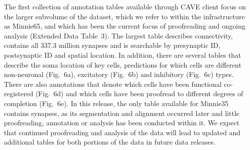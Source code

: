 \documentclass{article}
\begin{document}
The first collection of annotation tables available through CAVE client focus on the larger subvolume of the dataset, which we refer to within the infrastructure as Minnie65, and which has been the current focus of proofreading and ongoing analysis (Extended Data Table~3). The largest table describes connectivity, contains all 337.3 million synapses and is searchable by presynaptic ID, postsynaptic ID and spatial location. In addition, there are several tables that describe the soma location of key cells, predictions for which cells are different non-neuronal (Fig.~6a), excitatory (Fig.~6b) and inhibitory (Fig.~6c) types. There are also annotations that denote which cells have been functional co-registered (Fig.~6d) and which cells have been proofread to different degrees of completion (Fig.~6e). In this release, the only table available for Minnie35 contains synapses, as its segmentation and alignment occurred later and little proofreading, annotation or analysis has been conducted within it. We expect that continued proofreading and analysis of the data will lead to updated and additional tables for both portions of the data in future data releases.

\end{document}
